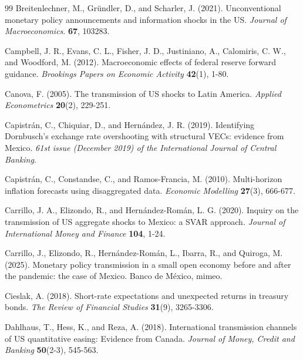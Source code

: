 \documentclass[12pt, reqno]{article}
\begin{document}
\begin{thebibliography}{99}
\bibitem{} \hypertarget{Breitenlechner et al. (2021)}{} 
Breitenlechner, M., Gründler, D., and Scharler, J. (2021). Unconventional monetary policy announcements and information shocks in the US. \textit{Journal of Macroeconomics}. \textbf{67}, 103283.

\bibitem{} \hypertarget{Campbell et al. (2012)}{} Campbell, J. R., Evans, C. L., Fisher, J. D., Justiniano, A., Calomiris, C. W., and Woodford, M. (2012). Macroeconomic effects of federal reserve forward guidance. \textit{Brookings Papers on Economic Activity} \textbf{42}(1), 1-80.

\bibitem{} \hypertarget{Canova (2005)}{} Canova, F. (2005). The transmission of US shocks to Latin America. \textit{Applied Econometrics} \textbf{20}(2), 229-251.



\bibitem{} \hypertarget{Capistran at al. (2019)}{}Capistrán, C., Chiquiar, D., and Hernández, J. R. (2019). Identifying Dornbusch's exchange rate overshooting with structural VECs: evidence from Mexico. \textit{61st issue (December 2019) of the International Journal of Central Banking}.

\bibitem{} \hypertarget{Capistran et al. (2010)}{} Capistrán, C., Constandse, C., and Ramos-Francia, M. (2010). Multi-horizon inflation forecasts using disaggregated data. \textit{Economic Modelling} \textbf{27}(3), 666-677.

\bibitem{} \hypertarget{Carrillo et al. (2020)}{} Carrillo, J. A., Elizondo, R., and Hernández-Román, L. G. (2020). Inquiry on the transmission of US aggregate shocks to Mexico: a SVAR approach. \textit{Journal of International Money and Finance} \textbf{104}, 1-24.

\bibitem{} \hypertarget{Carrillo et al. (2025)}{}Carrillo, J., Elizondo, R., Hernández-Román, L., Ibarra, R., and Quiroga, M. (2025). Monetary policy transmission in a small open economy
before and after the pandemic: the case of Mexico. Banco de México, mimeo.

\bibitem{} \hypertarget{Cieslak (2018)}{}
Cieslak, A. (2018). Short-rate expectations and unexpected returns in treasury bonds. \textit{The Review of Financial Studies} \textbf{31}(9), 3265-3306.

\bibitem{} \hypertarget{Dahlhaus et al. (2018)}{}
Dahlhaus, T., Hess, K., and Reza, A. (2018). International transmission channels of US quantitative easing: Evidence from Canada. \textit{Journal of Money, Credit and Banking} \textbf{50}(2-3), 545-563.


\end{thebibliography}
\end{document}

